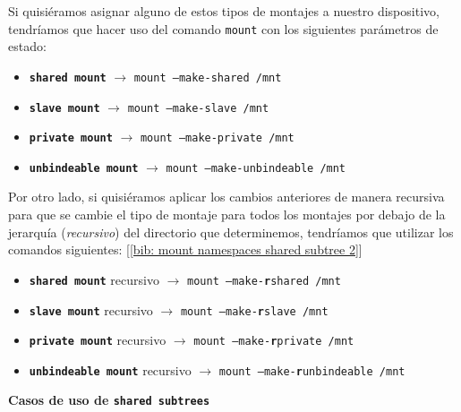 \documentclass[a4paper, oneside, 12pt]{book}
\begin{document}
	\noindent Si quisiéramos asignar alguno de estos tipos de montajes a nuestro dispositivo, tendríamos que hacer uso del comando \texttt{mount} con los siguientes parámetros de estado:
	\begin{itemize}
		\item \textbf{\texttt{shared mount}} $\rightarrow$ \texttt{mount --make-shared /mnt}
		\item \textbf{\texttt{slave mount}} $\rightarrow$ \texttt{mount --make-slave /mnt}
		\item \textbf{\texttt{private mount}} $\rightarrow$ \texttt{mount --make-private /mnt}
		\item \textbf{\texttt{unbindeable mount}} $\rightarrow$ \texttt{mount --make-unbindeable /mnt}
	\end{itemize}

	\noindent Por otro lado, si quisiéramos aplicar los cambios anteriores de manera recursiva para que se cambie el tipo de montaje para todos los montajes por debajo de la jerarquía (\textit{recursivo}) del directorio que determinemos, tendríamos que utilizar los comandos siguientes: [\ref{bib: mount namespaces shared subtree 2}]
	\begin{itemize}
		\item \textbf{\texttt{shared mount}} recursivo $\rightarrow$ \texttt{mount --make-\textbf{r}shared /mnt}
		\item \textbf{\texttt{slave mount}} recursivo $\rightarrow$ \texttt{mount --make-\textbf{r}slave /mnt}
		\item \textbf{\texttt{private mount}} recursivo $\rightarrow$ \texttt{mount --make-\textbf{r}private /mnt}
		\item \textbf{\texttt{unbindeable mount}} recursivo $\rightarrow$ \texttt{mount --make-\textbf{r}unbindeable /mnt}
	\end{itemize}

	\pagebreak
	
	\noindent \textbf{\large Casos de uso de \texttt{shared subtrees}}
	
\end{document}
